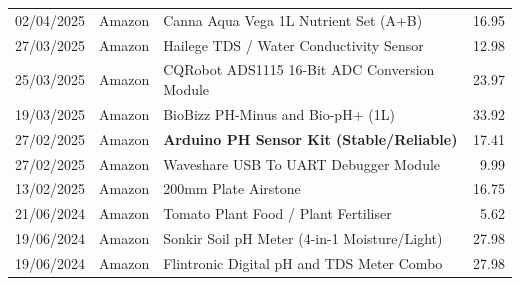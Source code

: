 \begin{table}[h!]
\begin{tabularx}{\textwidth}{@{} ll X r @{}}
		02/04/2025    & Amazon          & Canna Aqua Vega 1L Nutrient Set (A+B)                    & 16.95          \\
		27/03/2025    & Amazon          & Hailege TDS / Water Conductivity Sensor                  & 12.98          \\
		25/03/2025    & Amazon          & CQRobot ADS1115 16-Bit ADC Conversion Module             & 23.97          \\
		19/03/2025    & Amazon          & BioBizz PH-Minus and Bio-pH+ (1L)                        & 33.92          \\
		27/02/2025    & Amazon          & \textbf{Arduino PH Sensor Kit (Stable/Reliable)}         & 17.41          \\
		27/02/2025    & Amazon          & Waveshare USB To UART Debugger Module                    & 9.99           \\
		13/02/2025    & Amazon          & 200mm Plate Airstone                                     & 16.75          \\ \midrule
		21/06/2024    & Amazon          & Tomato Plant Food / Plant Fertiliser                     & 5.62           \\
		19/06/2024    & Amazon          & Sonkir Soil pH Meter (4-in-1 Moisture/Light)             & 27.98          \\
		19/06/2024    & Amazon          & Flintronic Digital pH and TDS Meter Combo                & 27.98          \\
		\bottomrule
	\end{tabularx}
\end{table}
